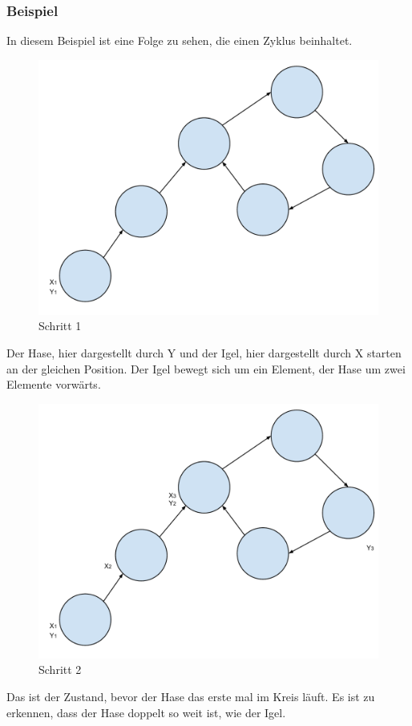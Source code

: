   \subsubsection{Beispiel}
  In diesem Beispiel ist eine Folge zu sehen, die einen Zyklus beinhaltet. 
    \begin{figure}[!h] 
    	\centering
    	\includegraphics[width=0.7\linewidth]{Rho1}
    	\caption{Schritt 1}
    	\label{fig:Rho1)}
    \end{figure}
    
    \noindent Der Hase, hier dargestellt durch Y und der Igel, hier dargestellt durch X starten an der gleichen Position. Der Igel bewegt sich um ein Element, der Hase um zwei Elemente vorw\"arts.

  \begin{figure}[!h] 
  	\centering
  	\includegraphics[width=0.7\linewidth]{Rho2}
  	\caption{Schritt 2}
  	\label{fig:Rho2)}
  \end{figure}
  
  \noindent Das ist der Zustand, bevor der Hase das erste mal im Kreis l\"auft. Es ist zu erkennen, dass der Hase doppelt so weit ist, wie der Igel.\\
  
